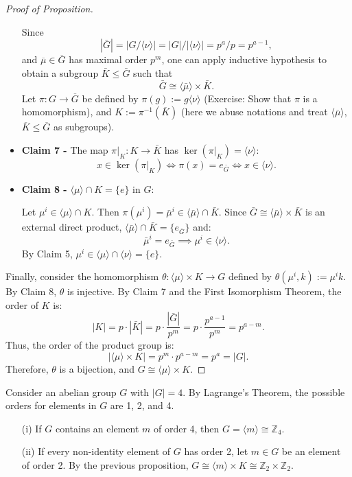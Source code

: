 \begin{proof}[Proof of Proposition]
\begin{itemize}
    Since 
    $$|\bar{G}| = |G/\langle \nu \rangle|= |G|/|\langle \nu \rangle| = p^a/p =  p^{a-1},$$ 
    and $\overline{\mu} \in \overline{G}$ has maximal order $p^m$, one can apply  inductive hypothesis to obtain a subgroup $\bar{K} \le \bar{G}$ such that 
    $$\bar{G} \cong \langle \bar{\mu} \rangle \times \bar{K}.$$
    Let $\pi: G \to \overline{G}$ be defined by $\pi(g) := g\langle \nu\rangle$ (Exercise: Show that $\pi$ is a homomorphism), and $K := \pi^{-1}(\overline{K})$ (here we abuse notations and treat $\langle \overline{\mu}\rangle$, $\overline{K} \leq \overline{G}$ as subgroups). 
    \item \textbf{Claim 7 -} The map $\pi|_K: K \to \bar{K}$ has $\ker(\pi|_K) = \langle \nu \rangle$:
    \[ x \in \ker(\pi|_K) \iff \pi(x) = e_{\bar{G}} \iff x \in \langle \nu \rangle. \]

    \item \textbf{Claim 8 -} $\langle \mu \rangle \cap K = \{e\}$ in $G$: 
    
    Let $\mu^i \in \langle \mu \rangle \cap K$. Then $\pi(\mu^i) = \bar{\mu}^i \in \langle \bar{\mu}\rangle \cap \bar{K}$. Since $\bar{G} \cong \langle \bar{\mu} \rangle \times \bar{K}$ is an external direct product, $\langle\bar{\mu} \rangle \cap \bar{K} = \{e_{\overline{G}}\}$ and:
    \[ \bar{\mu}^i = e_{\bar{G}} \implies \mu^i \in \langle \nu \rangle. \]
    By Claim 5, $\mu^i \in \langle \mu \rangle \cap \langle \nu \rangle = \{e\}$.
\end{itemize}

Finally, consider the homomorphism $\theta: \langle \mu \rangle \times K \to G$ defined by $\theta(\mu^i, k) := \mu^i k$. By Claim 8, $\theta$ is injective. By Claim 7 and the First Isomorphism Theorem, the order of $K$ is:
\[ |K| = p \cdot |\bar{K}| = p \cdot \frac{|\bar{G}|}{p^m} = p \cdot \frac{p^{a-1}}{p^m} = p^{a-m}. \]
Thus, the order of the product group is:
\[ |\langle \mu \rangle \times K| = p^m \cdot p^{a-m} = p^a = |G|. \]
Therefore, $\theta$ is a bijection, and $G \cong \langle \mu \rangle \times K$.
\end{proof}

\begin{example}
Consider an abelian group $G$ with $|G| = 4$. By Lagrange's Theorem, the possible orders for elements in $G$ are 1, 2, and 4.
\begin{enumerate}
    \item[(i)] If $G$ contains an element $m$ of order 4, then $G = \langle m \rangle \cong \mathbb{Z}_4$.
    \item[(ii)] If every non-identity element of $G$ has order 2, let $m \in G$ be an element of order 2. By the previous proposition, $G \cong \langle m \rangle \times K \cong \mathbb{Z}_2 \times \mathbb{Z}_2$.
\end{enumerate}
\end{example}

